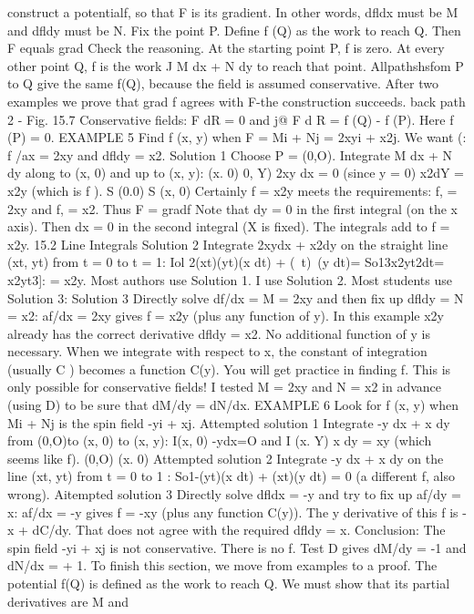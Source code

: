 construct a potentialf, so that F is its gradient. In other words, dfldx must be M and
dfldy must be N.
Fix the point P. Define f (Q) as the work to reach Q. Then F equals grad
Check the reasoning. At the starting point P, f is zero. At every other point Q, f is
the work J M dx + N dy to reach that point. Allpathshsfom P to Q give the same f(Q),
because the field is assumed conservative. After two examples we prove that grad f
agrees with F-the construction succeeds.
back path 2 -
Fig. 15.7 Conservative fields:  F dR = 0 and j@ F d R = f (Q) - f (P). Here f (P) = 0.
EXAMPLE 5 Find f (x, y) when F = Mi + Nj = 2xyi + x2j. We want (: f /ax = 2xy
and dfldy = x2.
Solution 1 Choose P = (0,O). Integrate M dx + N dy along to (x, 0) and up to (x, y):
(x. 0) 0, Y)
2xy dx = 0 (since y = 0) x2dY = x2y (which is f ). S (0.0) S (x, 0)
Certainly f = x2y meets the requirements: f, = 2xy and f, = x2. Thus F = gradf Note
that dy = 0 in the first integral (on the x axis). Then dx = 0 in the second integral
(X is fixed). The integrals add to f = x2y. 
15.2 Line Integrals
Solution 2 Integrate 2xydx + x2dy on the straight line (xt, yt) from t = 0 to t = 1:
Iol 2(xt)(yt)(x dt) + (~t)~(y dt)= So13x2yt2dt= x2yt3]: = x2y.
Most authors use Solution 1. I use Solution 2. Most students use Solution 3:
Solution 3 Directly solve df/dx = M = 2xy and then fix up dfldy = N = x2:
af/dx = 2xy gives f = x2y (plus any function of y).
In this example x2y already has the correct derivative dfldy = x2. No additional
function of y is necessary. When we integrate with respect to x, the constant of
integration (usually C ) becomes a function C(y).
You will get practice in finding f. This is only possible for conservative fields! I
tested M = 2xy and N = x2 in advance (using D) to be sure that dM/dy = dN/dx.
EXAMPLE 6 Look for f (x, y) when Mi + Nj is the spin field -yi + xj.
Attempted solution 1 Integrate -y dx + x dy from (0,O)to (x, 0) to (x, y):
I(x, 0)
-ydx=O and I
(x. Y)
x dy = xy (which seems like f).
(0,O) (x. 0)
Attempted solution 2 Integrate -y dx + x dy on the line (xt, yt) from t = 0 to 1 :
So1-(yt)(x dt) + (xt)(y dt) = 0 (a different f, also wrong).
Aitempted solution 3 Directly solve dfldx = -y and try to fix up af/dy = x:
af/dx = -y gives f = -xy (plus any function C(y)).
The y derivative of this f is -x + dC/dy. That does not agree with the required
dfldy = x. Conclusion: The spin field -yi + xj is not conservative. There is no f.
Test D gives dM/dy = -1 and dN/dx = + 1.
To finish this section, we move from examples to a proof. The potential f(Q) is
defined as the work to reach Q. We must show that its partial derivatives are M and
